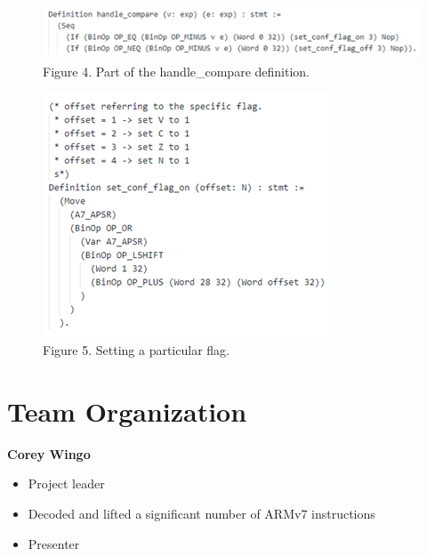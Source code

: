 \documentclass{article}
\begin{document}
\begin{multicols}{2}
\begin{figure}[H]
\includegraphics[width=\linewidth]{handle_compare_definition.png}\\
Figure 4. Part of the handle\_compare definition.
\centering
\end{figure}

\begin{figure}[H]
\includegraphics[width=\linewidth]{set_flag_example.png}\\
Figure 5. Setting a particular flag.
\centering
\end{figure}

\section*{\centering Team Organization}
\vspace{0.3cm}

\textbf{Corey Wingo}
\begin{itemize}
	\item Project leader
	\item Decoded and lifted a significant number of ARMv7 instructions
	\item Presenter\\
\end{itemize}



\end{multicols}
\end{document}
